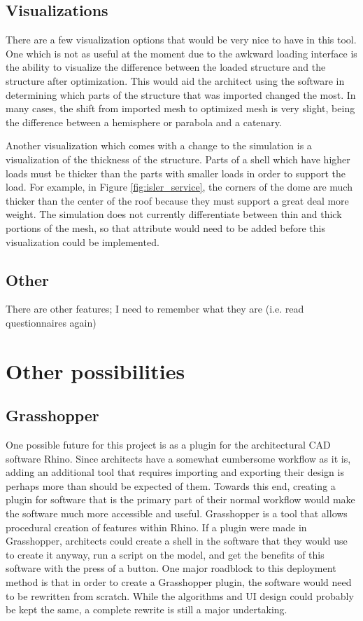 \documentclass{thesis}
\begin{document}
\subsection{Visualizations}
There are a few visualization options that would be very nice to have in this tool.  One which is not as useful at the moment due
to the awkward loading interface is the ability to visualize the difference between the loaded structure and the structure after
optimization.  This would aid the architect using the software in determining which parts of the structure that was imported
changed the most.  In many cases, the shift from imported mesh to optimized mesh is very slight, being the difference between
a hemisphere or parabola and a catenary.

Another visualization which comes with a change to the simulation is a visualization of the thickness of the structure.  Parts
of a shell which have higher loads must be thicker than the parts with smaller loads in order to support the load.  For example,
in Figure \ref{fig:isler_service}, the corners of the dome are much thicker than the center of the roof because they must support
a great deal more weight.  The simulation does not currently differentiate between thin and thick portions of the mesh, so that
attribute would need to be added before this visualization could be implemented.

\subsection{Other}
There are other features; I need to remember what they are (i.e. read questionnaires again)

\section{Other possibilities}

\subsection{Grasshopper}
One possible future for this project is as a plugin for the architectural CAD software Rhino.  Since architects have a
somewhat cumbersome workflow as it is, adding an additional tool that requires importing and exporting their design is
perhaps more than should be expected of them.  Towards this end, creating a plugin for software that is the primary part
of their normal workflow would make the software much more accessible and useful.  Grasshopper is a tool that allows procedural
creation of features within Rhino.  If a plugin were made in Grasshopper, architects could create a shell in the software that
they would use to create it anyway, run a script on the model, and get the benefits of this software with the press of a
button.  One major roadblock to this deployment method is that in order to create a Grasshopper plugin, the software would
need to be rewritten from scratch.  While the algorithms and UI design could probably be kept the same, a complete rewrite
is still a major undertaking.
\end{document}
